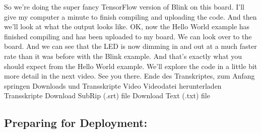 So we're doing the super fancy TensorFlow version of Blink
on this board.
I'll give my computer a minute to finish compiling and uploading the code.
And then we'll look at what the output looks like.
OK, now the Hello World example has finished compiling
and has been uploaded to my board.
We can look over to the board.
And we can see that the LED is now dimming
in and out at a much faster rate than it was before with the Blink example.
And that's exactly what you should expect from the Hello World example.
We'll explore the code in a little bit more detail in the next video.
See you there.
Ende des Transkriptes, zum Anfang springen
Downloads und Transskripte
Video
Videodatei herunterladen
Transskripte
Download SubRip (.srt) file
Download Text (.txt) file

\subsection{Preparing for Deployment:}

